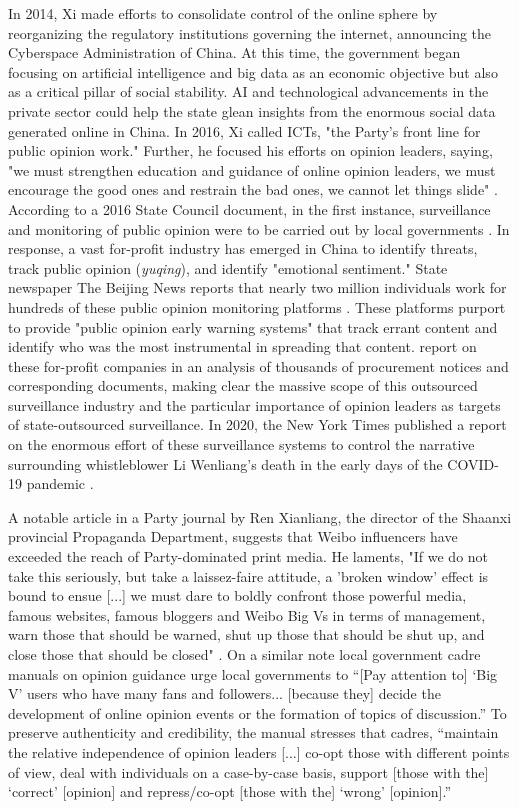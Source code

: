 \documentclass[11pt]{article}
\begin{document}
In 2014, Xi made efforts to consolidate control of the online sphere by reorganizing the regulatory institutions governing the internet, announcing the Cyberspace Administration of China. At this time, the government began focusing on artificial intelligence and big data as an economic objective but also as a critical pillar of social stability. AI and technological advancements in the private sector could help the state glean insights from the enormous social data generated online in China. In 2016, Xi called ICTs, "the Party's front line for public opinion work." Further, he focused his efforts on opinion leaders, saying, "we must strengthen education and guidance of online opinion leaders, we must encourage the good ones and restrain the bad ones, we cannot let things slide" \citep{creemers2017cyber}. According to a 2016 State Council document, in the first instance, surveillance and monitoring of public opinion were to be carried out by local governments \citep{statecouncil2016}. In response, a vast for-profit industry has emerged in China to identify threats, track public opinion ({\it yuqing}), and identify "emotional sentiment." State newspaper The Beijing News reports that nearly two million individuals work for hundreds of these public opinion monitoring platforms \citep{bjn2014}. These platforms purport to provide "public opinion early warning systems" that track errant content and identify who was the most instrumental in spreading that content. \cite{batke2020message} report on these for-profit companies in an analysis of thousands of procurement notices and corresponding documents, making clear the massive scope of this outsourced surveillance industry and the particular importance of opinion leaders as targets of state-outsourced surveillance. In 2020, the New York Times published a report on the enormous effort of these surveillance systems to control the narrative surrounding whistleblower Li Wenliang's death in the early days of the COVID-19 pandemic \citep{zhong2020no}.

A notable article in a Party journal by Ren Xianliang, the director of the Shaanxi provincial Propaganda Department, suggests that Weibo influencers have exceeded the reach of Party-dominated print media. He laments, "If we do not take this seriously, but take a laissez-faire attitude, a 'broken window' effect is bound to ensue [...] we must dare to boldly confront those powerful media, famous websites, famous bloggers and Weibo Big Vs in terms of management, warn those that should be warned, shut up those that should be shut up, and close those that should be closed" \citep{creemers2017cyber}. On a similar note local government cadre manuals on opinion guidance urge local governments to ``[Pay attention to] ‘Big V’ users who have many fans and followers... [because they] decide the development of online opinion events or the formation of topics of discussion.'' To preserve authenticity and credibility, the manual stresses that cadres, ``maintain the relative independence of opinion leaders [...] co-opt those with different points of view, deal with individuals on a case-by-case basis, support [those with the] ‘correct’ [opinion] and repress/co-opt [those with the] ‘wrong’ [opinion].''
\end{document}
